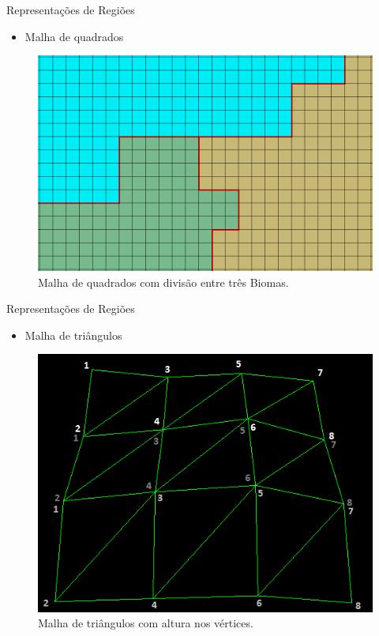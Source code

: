 \begin{frame}{Representações de Regiões}
    \begin{itemize} \setlength\itemsep{1em}
        \item Malha de quadrados
        
    \end{itemize}
    \begin{figure}[H]
        \centering
        \includegraphics[width=.5\textwidth, height=.5\textheight]{img/squadStripBiomes}
        \caption{Malha de quadrados com divisão entre três Biomas.}
        \label{fig:squadStripBiomes}
    \end{figure}
\end{frame}

\begin{frame}{Representações de Regiões}
    \begin{itemize} \setlength\itemsep{1em}
        \item Malha de triângulos
        
    \end{itemize}
    \begin{figure}[H]
        \centering
        \includegraphics[width=.5\textwidth, height=.5\textheight]{img/triangle_strips}
        \caption{Malha de triângulos com altura nos vértices.}
        \label{fig:triangle_strip}
    \end{figure}
\end{frame}


